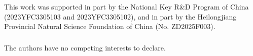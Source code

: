 \documentclass[runningheads]{llncs}
\begin{document}
\begin{credits}
\subsubsection{\ackname}
This work was supported in part by the National Key R\&D Program of China (2023YFC3305103 and 2023YFC3305102), and in part by the Heilongjiang Provincial Natural Science Foundation of China (No. ZD2025F003).

\subsubsection{\discintname}
The authors have no competing interests to declare.
\end{credits}



\end{document}
